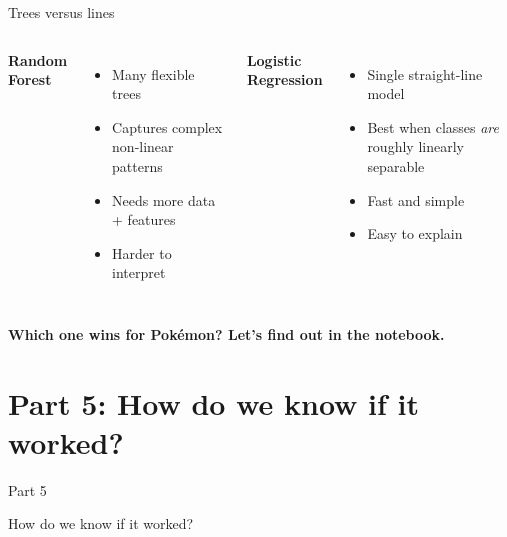 \documentclass[aspectratio=169, 11pt]{beamer}
\begin{document}
\begin{frame}{Trees versus lines}
    \begin{columns}[T]
        \textbf{Random Forest}
        \begin{itemize}
            \item Many flexible trees
            \item Captures complex non-linear patterns
            \item Needs more data + features
            \item Harder to interpret
        \end{itemize}

        \textbf{Logistic Regression}
        \begin{itemize}
            \item Single straight-line model
            \item Best when classes \emph{are} roughly linearly separable
            \item Fast and simple
            \item Easy to explain
        \end{itemize}
    \end{columns}

    \vspace{0.6cm}
    \begin{center}
    \textcolor{ausred}{\textbf{Which one wins for Pokémon? Let's find out in the notebook.}}
    \end{center}
\end{frame}

\section{Part 5: How do we know if it worked?}
\begin{frame}
    \centering
    \Huge \textcolor{ausred}{Part 5}

    \vspace{0.5cm}
    \LARGE How do we know if it worked?
\end{frame}
\end{document}
